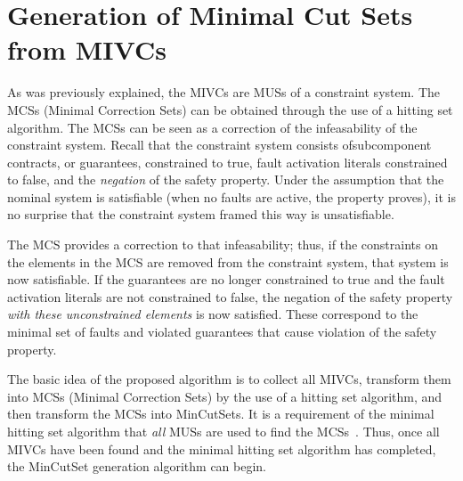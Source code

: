 \section{Generation of Minimal Cut Sets from MIVCs}
As was previously explained, the MIVCs are MUSs of a constraint system. The MCSs (Minimal Correction Sets) can be obtained through the use of a hitting set algorithm. The MCSs can be seen as a correction of the infeasability of the constraint system. Recall that the constraint system consists ofsubcomponent contracts, or guarantees, constrained to true, fault activation literals constrained to false, and the \textit{negation} of the safety property. Under the assumption that the nominal system is satisfiable (when no faults are active, the property proves), it is no surprise that the constraint system framed this way is unsatisfiable. 

The MCS provides a correction to that infeasability; thus, if the constraints on the elements in the MCS are removed from the constraint system, that system is now satisfiable. If the guarantees are no longer constrained to true and the fault activation literals are not constrained to false, the negation of the safety property \textit{with these unconstrained elements} is now satisfied. These correspond to the minimal set of faults and violated guarantees that cause violation of the safety property. 

The basic idea of the proposed algorithm is to collect all MIVCs, transform them into MCSs (Minimal Correction Sets) by the use of a hitting set algorithm, and then transform the MCSs into MinCutSets. It is a requirement of the minimal hitting set algorithm that \textit{all} MUSs are used to find the MCSs~\cite{liffiton2016fast,gainer2017minimal,murakami2013efficient}. Thus, once all MIVCs have been found and the minimal hitting set algorithm has completed, the MinCutSet generation algorithm can begin. 


